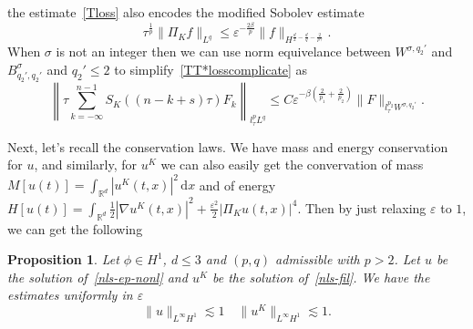 \documentclass[10pt,a4paper]{article}
\newtheorem{proposition}[theorem]{Proposition}
\begin{document}
  the estimate~\eqref{Tloss} also encodes the modified Sobolev estimate
  \begin{equation}
    \label{sobmod}
    \tau^\frac1p \|\Pi_K f\|_{L^q} \leq \varepsilon^{-\frac{2\beta}p} 
    \|f \|_{H^{\frac{d}2-\frac{d}q-\frac2{p\gamma}}}.
  \end{equation}
  When \(\sigma\) is 
  not an integer then we can use norm equivelance between \(W^{\sigma,q_2'}\) and 
  \(B^\sigma_{q_2',q_2'}\) and \(q_2' \leq 2\) to
  simplify~\eqref{TT*losscomplicate} as 
  \begin{equation}\label{TT*loss}
    \left\| \tau \sum_{k=-\infty}^{n-1} S_K ((n-k+s)\tau) F_k \right\|_{l^p_\tau L^q} 
    \leq C \varepsilon^{-\beta(\frac2{p_1}+\frac2{p_2})} \|F\|_{l^{p_2}_\tau 
    W^{\sigma,q_2'}}.
  \end{equation}

  
  Next, let's recall the conservation laws. We have mass and energy conservation
  for \(u\), and similarly, for \(u^K\) we can also easily get the convervation
  of mass \(M[u(t)] = \int_{\mathbb R^d} |u^K(t,x)|^2 \,\mathrm{d}x\) and of energy
  \(H[u(t)] = \int_{\mathbb R^d} \frac12|\nabla u^K(t,x)|^2 + \frac{\varepsilon^2}2 |\Pi_K u(t,x)|^4\). 
  Then by just relaxing \(\varepsilon\) to \(1\), we can get the following
  \begin{proposition}
    Let \(\phi \in H^1\), \( d \leq 3 \) and \( (p,q) \) admissible with
    \( p > 2 \). Let \( u \) be the solution of~\eqref{nls-ep-nonl} and \(u^K\)
    be the solution of~\eqref{nls-fil}. We have the estimates uniformly in
    \(\varepsilon\)
    \begin{equation}\label{LinftyH1}
      \|u\|_{L^\infty H^1} \lesssim 1 \quad
      \|u^K\|_{L^\infty H^1} \lesssim 1.
    \end{equation}
  \end{proposition}
  
\end{document}
